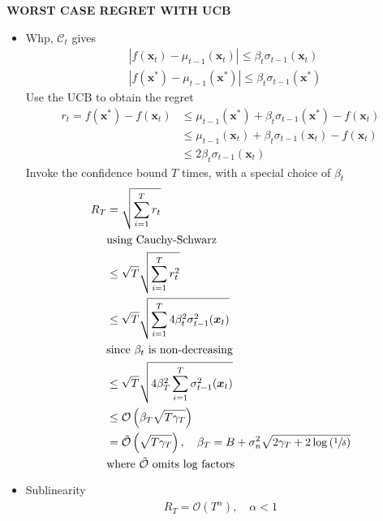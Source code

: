 \begin{whitebox}{\textbf{WORST CASE REGRET WITH UCB}}
    \begin{itemize}
        \item Whp, $\mathcal{C}_t$ gives
        \begin{align*}
            &|f(\mathbf{x}_t)-\mu_{t-1}(\bm{x}_t)|\leq\beta_t\sigma_{t-1}(\bm{x}_t)\\
            &|f(\mathbf{x}^*)-\mu_{t-1}(\bm{x}^*)|\leq\beta_t\sigma_{t-1}(\bm{x}^*)
        \end{align*}
        Use the UCB to obtain the regret
        \begin{align*}
            r_t=f(\bm{x}^*)-f(\bm{x}_t)&\leq\mu_{t-1}(\bm{x}^*)+\beta_t\sigma_{t-1}(\bm{x}^*)-f(\bm{x}_t)\\
            &\leq\mu_{t-1}(\bm{x}_t)+\beta_t\sigma_{t-1}(\bm{x}_t)-f(\bm{x}_t)\\
            &\leq 2\beta_t\sigma_{t-1}(\bm{x}_t)
        \end{align*}
        Invoke the confidence bound $T$ times, with a special choice of $\beta_t$
        \begin{align*}
            R_T&=\sqrt{\sum_{i=1}^Tr_t}\\
            &\text{using Cauchy-Schwarz}\\
            &\leq\sqrt{T}\sqrt{\sum_{i=1}^Tr_t^2}\\
            &\leq\sqrt{T}\sqrt{\sum_{i=1}^T4\beta_t^2\sigma_{t-1}^2(\bm{x}_t)}\\
            &\text{since $\beta_t$ is non-decreasing}\\
            &\leq\sqrt{T}\sqrt{4\beta_T^2\sum_{i=1}^T\sigma_{t-1}^2(\bm{x}_t)}\\
            &\leq\mathcal{O}\left(\beta_T\sqrt{T\gamma_T}\right)\\
            &=\tilde{\mathcal{O}}\left(\sqrt{T\gamma_T}\right),\quad\beta_T=B+\sigma_n^2\sqrt{2\gamma_T+2\log\left(\sfrac{1}{\delta}\right)}\\
            &\text{where $\tilde{\mathcal{O}}$ omits log factors}
        \end{align*}
        \item Sublinearity
        \begin{align*}
            R_T=\mathcal{O}(T^\alpha),\quad\alpha<1
        \end{align*}
    \end{itemize}
\end{whitebox}

